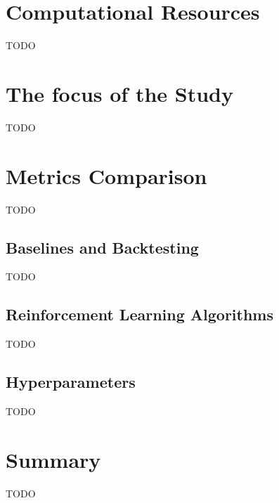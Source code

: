 \documentclass[../xlapes02]{subfiles}
\begin{document}
    \section{Computational Resources}\label{sec:computational-resources}
    TODO


    \section{The focus of the Study}\label{sec:the-focus-of-the-study}
    TODO


    \section{Metrics Comparison}\label{sec:metrics-comparison}
    TODO

    \subsection{Baselines and Backtesting}\label{subsec:baselines-and-backtesting}
    TODO

    \subsection{Reinforcement Learning Algorithms}\label{subsec:rl-algorithms}
    TODO

    \subsection{Hyperparameters}\label{subsec:hyperparameters}
    TODO


    \section{Summary}\label{sec:summary}
    TODO
\end{document}
